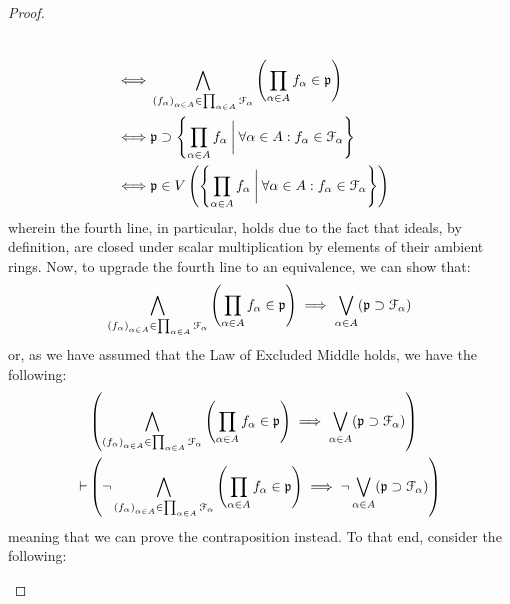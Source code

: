 \begin{proof}
\begin{enumerate}
$$\begin{aligned}
                                            \\
                                            \iff & \bigwedge_{\left(f_{\alpha}\right)_{\alpha \in A} \in \prod_{\alpha \in A} \mathcal{F}_{\alpha}} \left(\prod_{\alpha \in A} f_{\alpha} \in \mathfrak{p}\right)
                                            \\
                                            \iff & \mathfrak{p} \supset \left\{\prod_{\alpha \in A} f_{\alpha} \: \bigg| \: \forall \alpha \in A: f_{\alpha} \in \mathcal{F}_{\alpha} \right\}
                                            \\
                                            \iff & \mathfrak{p} \in V\left(\left\{\prod_{\alpha \in A} f_{\alpha} \: \bigg| \: \forall \alpha \in A: f_{\alpha} \in \mathcal{F}_{\alpha} \right\}\right)
                                        \end{aligned}
                                    $$
                                wherein the fourth line, in particular, holds due to the fact that ideals, by definition, are closed under scalar multiplication by elements of their ambient rings. Now, to upgrade the fourth line to an equivalence, we can show that:
                                    $$\bigwedge_{\left(f_{\alpha}\right)_{\alpha \in A} \in \prod_{\alpha \in A} \mathcal{F}_{\alpha}} \left(\prod_{\alpha \in A} f_{\alpha} \in \mathfrak{p}\right) \implies \bigvee_{\alpha \in A} (\mathfrak{p} \supset \mathcal{F}_{\alpha})$$
                                or, as we have assumed that the Law of Excluded Middle holds, we have the following:
                                    $$
                                        \begin{aligned}
                                            & \left(\bigwedge_{\left(f_{\alpha}\right)_{\alpha \in A} \in \prod_{\alpha \in A} \mathcal{F}_{\alpha}} \left(\prod_{\alpha \in A} f_{\alpha} \in \mathfrak{p}\right) \implies \bigvee_{\alpha \in A} (\mathfrak{p} \supset \mathcal{F}_{\alpha})\right)
                                            \\
                                            \vdash & \left(\neg \bigwedge_{\left(f_{\alpha}\right)_{\alpha \in A} \in \prod_{\alpha \in A} \mathcal{F}_{\alpha}} \left(\prod_{\alpha \in A} f_{\alpha} \in \mathfrak{p}\right) \implies  \neg \bigvee_{\alpha \in A} (\mathfrak{p} \supset \mathcal{F}_{\alpha})\right)
                                        \end{aligned}
                                    $$
                                meaning that we can prove the contraposition instead. To that end, consider the following:
                                    $$
$$
\end{enumerate}
\end{proof}
